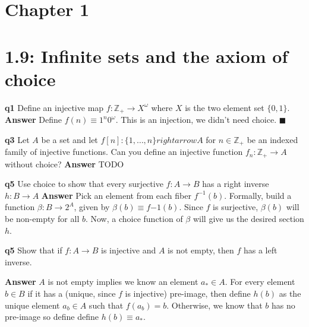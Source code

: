 \documentclass{article}
\begin{document}
\newcommand*{\Z}{\mathbb Z}
\newcommand*{\start}[1]{\leavevmode\newline \textbf{#1} }
\newcommand*{\answer}{\start{Answer}}
\newcommand*{\qed}{\ensuremath{\blacksquare}}


\section{Chapter 1}
\section{1.9: Infinite sets and the axiom of choice}
\start{q1} Define an injective map $f: \Z_+ \rightarrow X^\omega$ where $X$ is the two element set $\{0, 1\}$.
\answer Define $f(n) \equiv 1^n 0^\omega$. This is an injection, we didn't need choice. \qed

\start{q3} Let $A$ be a set and let $f[n] : \{1, \dots, n \} rightarrow A$ for $n \in \mathbb Z_+$ be an indexed family of injective functions. Can you define
an injective function $f_n: \Z_+ \rightarrow A$ without choice?
\answer TODO

\start{q5} Use choice to show that every surjective $f: A \rightarrow B$ has a right inverse $h: B \rightarrow A$
\answer Pick an element from each fiber $f^{-1}(b)$. Formally, build a function $\beta: B \rightarrow 2^A$, given by  $\beta(b) \equiv f{-1}(b)$. Since $f$ is surjective,
$\beta(b)$ will be non-empty for all $b$. Now, a choice function of $\beta$ will give us the desired section $h$.

\start{q5} Show that if $f: A \rightarrow B$ is injective and $A$ is not empty, then $f$ has a left inverse.

\answer $A$ is not empty implies we know an element $a_* \in A$. For every element $b \in B$ if it has a (unique, since $f$ is injective) pre-image, then define
$h(b)$ as the unique element $a_b \in A$ such that $f(a_b) = b$. Otherwise, we know that $b$ has no pre-image so define define $h(b) \equiv a_*$.
\end{document}
